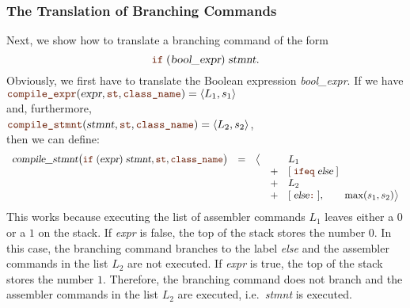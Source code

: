 \subsubsection{The Translation of Branching Commands}
Next, we show how to translate a branching command of the form
\[ \mytt{if}\; (\textsl{bool\_expr})\; \textsl{stmnt}. \]
Obviously, we first have to translate the Boolean expression \textsl{bool\_expr}.
If we have
\\[0.2cm]
\hspace*{1.3cm}
$\mytt{compile\_expr}(\textsl{expr}, \mytt{st}, \mytt{class\_name}) = \pair(L_1, s_1)$
\\[0.2cm]
and, furthermore, 
\\[0.2cm]
\hspace*{1.3cm}
$\mytt{compile\_stmnt}(\textsl{stmnt}, \mytt{st}, \mytt{class\_name}) = \pair(L_2, s_2)$,
\\[0.2cm]
then we can define:
\[
   \begin{array}[t]{lcccl}
   \textsl{compile\_stmnt}\bigl(\mytt{if}\; (\textsl{expr})\;\textsl{stmnt}, \mytt{st}, \mytt{class\_name}\bigr) & = & \bigl\langle & & L_1  \\
   &&& + & [\;\mytt{ifeq}\;\textsl{else}\;] \\
   &&& + & L_2 \\
   &&& + & [\;\textsl{else}\mytt{:}\;], \qquad \max(s_1, s_2) \bigr\rangle        
\end{array}
\]
This works because executing the list of assembler commands $L_1$ leaves either a $0$ or a $1$ on the stack.
If \textsl{expr} is false, the top of the stack stores the number $0$.  In this case, the branching command
 branches to the label \textsl{else} and the assembler commands in the list $L_2$ are not
executed.  If \textsl{expr} is true, the top of the stack stores the number $1$.  Therefore, the branching
command  does not branch and the assembler commands in the list $L_2$ are executed,
i.e.~\textsl{stmnt} is executed.

